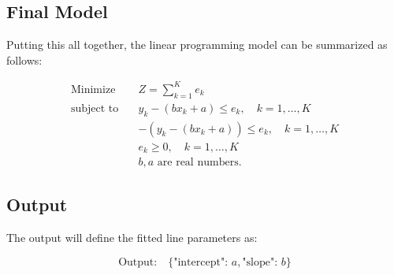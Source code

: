 \documentclass{article}
\begin{document}
\subsection*{Final Model}
Putting this all together, the linear programming model can be summarized as follows:

\begin{align*}
\text{Minimize} \quad & Z = \sum_{k=1}^{K} e_k \\
\text{subject to} \quad & y_k - (bx_k + a) \leq e_k, \quad k = 1, \ldots, K \\
& -(y_k - (bx_k + a)) \leq e_k, \quad k = 1, \ldots, K \\
& e_k \geq 0, \quad k = 1, \ldots, K \\
& b, a \text{ are real numbers.}
\end{align*}

\subsection*{Output}
The output will define the fitted line parameters as:

\[
\text{Output:} \quad \{ \text{"intercept": } a, \text{"slope": } b \}
\]
\end{document}
